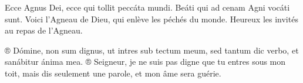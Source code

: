 
\begin{paracol}{2}

\LigneParacol{0cm}
{Ecce Agnus Dei, ecce qui tollit peccáta mundi. Beáti qui ad cenam Agni vocáti sunt.}
{Voici l’Agneau de Dieu, qui enlève les péchés du monde. Heureux les invités au repas de l'Agneau.}

\LigneParacol{0cm}
{® Dómine, non sum dignus, ut intres sub tectum meum, sed tantum dic verbo, et sanábitur ánima mea.}
{® Seigneur, je ne suis pas digne que tu entres sous mon toit, mais dis seulement une parole, et mon âme sera guérie.}

\end{paracol}

